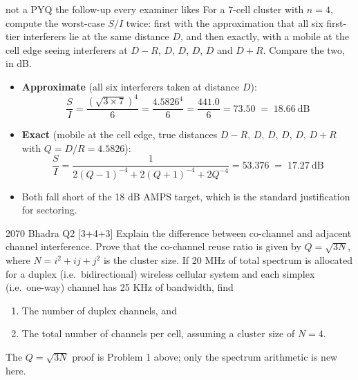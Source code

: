 \begin{asked}[PROBLEM]{not a PYQ \textperiodcentered{} the follow-up every examiner likes \added}
For a 7-cell cluster with $n = 4$, compute the worst-case $S/I$ twice: first with the
approximation that all six first-tier interferers lie at the same distance $D$, and then
exactly, with a mobile at the cell edge seeing interferers at $D-R$, $D$, $D$, $D$, $D$ and
$D+R$. Compare the two, in dB.
\end{asked}
\begin{itemize}
  \item \textbf{Approximate} (all six interferers taken at distance $D$):
        \[ \frac{S}{I} = \frac{(\sqrt{3\times7})^{4}}{6} = \frac{4.5826^4}{6}
           = \frac{441.0}{6} = 73.50 \;=\; 18.66\ \text{dB} \]
  \item \textbf{Exact} (mobile at the cell edge, true distances
        $D-R,\,D,\,D,\,D,\,D,\,D+R$ with $Q = D/R = 4.5826$):
        \[ \frac{S}{I} = \frac{1}{2(Q-1)^{-4} + 2(Q+1)^{-4} + 2Q^{-4}}
           = 53.376 \;=\; 17.27\ \text{dB} \]
  \item {} Both fall short of the 18 dB AMPS
        target, which is the standard justification for sectoring.
\end{itemize}

\hr

{\color{sub}\footnotesize {} }

\begin{asked}{2070 Bhadra \textperiodcentered{} Q2 \textperiodcentered{} [3+4+3]}
Explain the difference between co-channel and adjacent channel interference. Prove that the
co-channel reuse ratio is given by $Q = \sqrt{3N}$, where $N = i^2 + ij + j^2$ is the cluster
size. If 20 MHz of total spectrum is allocated for a duplex (i.e.\ bidirectional) wireless
cellular system and each simplex (i.e.\ one-way) channel has 25 KHz of bandwidth, find
\begin{enumerate}[label=\alph*), leftmargin=1.6em]
  \item The number of duplex channels, and
  \item The total number of channels per cell, assuming a cluster size of $N = 4$.
\end{enumerate}
\end{asked}
{\color{sub}\footnotesize The $Q=\sqrt{3N}$ proof is Problem 1 above; only the spectrum
arithmetic is new here.}

